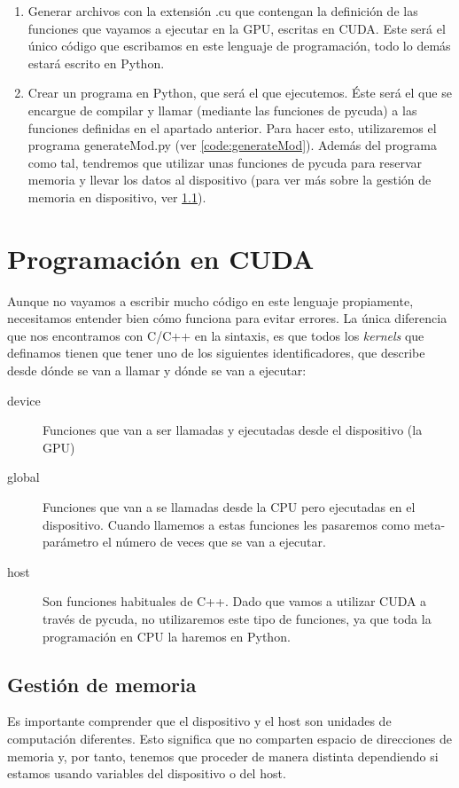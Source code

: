 \begin{enumerate}
	\item Generar archivos con la extensión .cu que contengan la definición de las funciones que vayamos a ejecutar en la GPU, escritas en \ac{CUDA}. Este será el único código que escribamos en este lenguaje de programación, todo lo demás estará escrito en Python.
	\item Crear un programa en Python, que será el que ejecutemos. Éste será el que se encargue de compilar y llamar (mediante las funciones de pycuda) a las funciones definidas en el apartado anterior. Para hacer esto, utilizaremos el programa generateMod.py (ver \ref{code:generateMod}). Además del programa como tal, tendremos que utilizar unas funciones de pycuda para reservar memoria y llevar los datos al dispositivo (para ver más sobre la gestión de memoria en dispositivo, ver \ref{subsec:gestionDeMemoria}).
\end{enumerate}




\section{Programación en \ac{CUDA}}
Aunque no vayamos a escribir mucho código en este lenguaje propiamente, necesitamos entender bien cómo funciona para evitar errores.
La única diferencia que nos encontramos con C/C++ en la sintaxis, es que todos los \textit{kernels} que definamos tienen que tener uno de los siguientes identificadores, que describe desde dónde se van a llamar y dónde se van a ejecutar:
\begin{description}
	\item[device] Funciones que van a ser llamadas y ejecutadas desde el dispositivo (la \ac{GPU})
	\item[global] Funciones que van a se llamadas desde la \ac{CPU} pero ejecutadas en el dispositivo. Cuando llamemos a estas funciones les pasaremos como meta-parámetro el número de veces que se van a ejecutar.
	\item[host] Son funciones habituales de C++. Dado que vamos a utilizar \ac{CUDA} a través de pycuda, no utilizaremos este tipo de funciones, ya que toda la programación en CPU la haremos en Python.
\end{description}
\subsection{Gestión de memoria}
\label{subsec:gestionDeMemoria}
Es importante comprender que el dispositivo y el host son unidades de computación diferentes. Esto significa que no comparten espacio de direcciones de memoria y, por tanto, tenemos que proceder de manera distinta dependiendo si estamos usando variables del dispositivo o del host.


